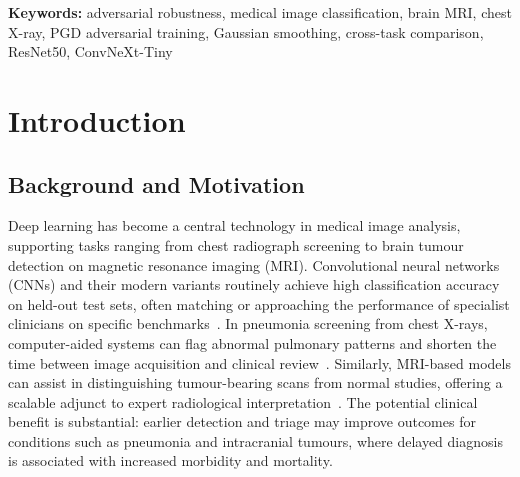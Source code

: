 \documentclass[12pt,a4paper,oneside]{report}
\begin{document}
\vspace{1.2em}
\noindent\textbf{Keywords:}
adversarial robustness,
medical image classification,
brain MRI,
chest X-ray,
PGD adversarial training,
Gaussian smoothing,
cross-task comparison,
ResNet50,
ConvNeXt-Tiny

\newpage

\tableofcontents
\clearpage
\listoffigures
\clearpage
\listoftables
\newpage
{}
\setcounter{page}{1}

\chapter{Introduction}
\label{ch:introduction}

\section{Background and Motivation}
\label{sec:background}


Deep learning has become a central technology in medical image analysis, supporting tasks ranging from chest radiograph screening to brain tumour detection on magnetic resonance imaging (MRI). Convolutional neural networks (CNNs) and their modern variants routinely achieve high classification accuracy on held-out test sets, often matching or approaching the performance of specialist clinicians on specific benchmarks~\cite{esteva2017dermatologist,rajpurkar2017chexnet}. In pneumonia screening from chest X-rays, computer-aided systems can flag abnormal pulmonary patterns and shorten the time between image acquisition and clinical review~\cite{kermany2018identifying}. Similarly, MRI-based models can assist in distinguishing tumour-bearing scans from normal studies, offering a scalable adjunct to expert radiological interpretation~\cite{litjens2017survey}. The potential clinical benefit is substantial: earlier detection and triage may improve outcomes for conditions such as pneumonia and intracranial tumours, where delayed diagnosis is associated with increased morbidity and mortality.
\end{document}
